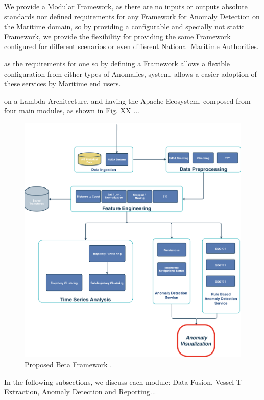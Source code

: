 We provide a Modular Framework, as there are no inputs or outputs absolute standards nor defined requirements for any Framework for Anomaly Detection on the Maritime domain, so by providing a configurable and specially not static Framework, we provide the flexibility for providing the same Framework configured for different scenarios or even different National Maritime Authorities.

as the requirements for one so by defining a Framework allows a flexible configuration from either types of Anomalies, system, allows a easier adoption of these services by Maritime end users. 

on a Lambda Architecture, and having the Apache Ecosystem. composed from four main modules, as shown in Fig. XX ...

\begin{figure}[H]
	\centering
	\includegraphics[scale = .37]{figures/Ch3/Framework.pdf}
    \caption{Proposed Beta Framework .}
    \label{fig:Framework}
\end{figure}

In the following subsections, we discuss each module: Data Fusion, Vessel T Extraction, Anomaly Detection and Reporting...


